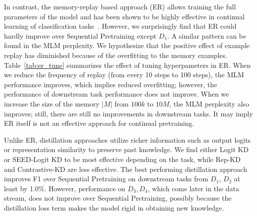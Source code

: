 In contrast, the memory-replay based approach (ER) allows training the full parameters of the model and has been shown to be highly effective in continual learning of classification tasks~\cite{Wang2019SentenceEA, chaudhry2019tiny}. However, we surprisingly find that ER could hardly improve over Sequential Pretraining except $D_1$. %
A similar pattern can be found in the MLM perplexity. 
We hypothesize that the positive effect of example replay has diminished because of the overfitting to the memory examples. Table~\ref{tab:er_tune} summarizes the effect of tuning hyperpameters in ER. When we reduce the frequency of replay (from every 10 steps to 100 steps), the MLM performance improves, which implies reduced overfitting; however, the performance of downstream task performance does not improve. When we increase the size of the memory $|M|$ from $100k$ to $10M$, the MLM perplexity also improves; still, there are still no improvements in downstream tasks. It may imply ER itself is not an effective approach for continual pretraining. %



Unlike ER, distillation approaches utilize richer information such as output logits or representation similarity to preserve past knowledge. We find either Logit KD or SEED-Logit KD to be most effective depending on the task, while Rep-KD and Contrastive-KD are less effective. The best performing distillation approach improves F1 over Sequential Pretraining on downstream tasks from $D_1$, $D_2$ at least by 1.0\%. However, performance on $D_3, D_4$, which come later in the data stream, does not improve over Sequential Pretraining, possibly because the distillation loss term %
makes the model rigid in obtaining new knowledge.


